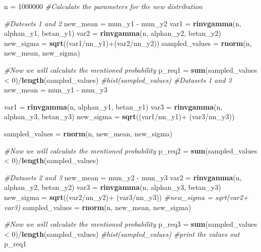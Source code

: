 \documentclass[]{article}
\newenvironment{Shaded}{\begin{snugshade}}{\end{snugshade}}
\newcommand{\KeywordTok}[1]{\textcolor[rgb]{0.13,0.29,0.53}{\textbf{{#1}}}}
\newcommand{\DecValTok}[1]{\textcolor[rgb]{0.00,0.00,0.81}{{#1}}}
\newcommand{\StringTok}[1]{\textcolor[rgb]{0.31,0.60,0.02}{{#1}}}
\newcommand{\CommentTok}[1]{\textcolor[rgb]{0.56,0.35,0.01}{\textit{{#1}}}}
\newcommand{\NormalTok}[1]{{#1}}
\begin{document}
\begin{Shaded}
\begin{Highlighting}[]
\NormalTok{n =}\StringTok{ }\DecValTok{1000000}
\CommentTok{#Calculate the parameters for the new distribution}

\CommentTok{#Datesets 1 and 2}
\NormalTok{new_mean =}\StringTok{ }\NormalTok{mun_y1 -}\StringTok{ }\NormalTok{mun_y2}
\NormalTok{var1 =}\StringTok{ }\KeywordTok{rinvgamma}\NormalTok{(n, alphan_y1, betan_y1)}
\NormalTok{var2 =}\StringTok{ }\KeywordTok{rinvgamma}\NormalTok{(n, alphan_y2, betan_y2)}
\NormalTok{new_sigma =}\StringTok{ }\KeywordTok{sqrt}\NormalTok{((var1/nn_y1)+(var2/nn_y2))}
\NormalTok{sampled_values =}\StringTok{ }\KeywordTok{rnorm}\NormalTok{(n, new_mean, new_sigma)}

\CommentTok{#Now we will calculate the mentioned probability}
\NormalTok{p_req1 =}\StringTok{ }\KeywordTok{sum}\NormalTok{(sampled_values <}\StringTok{ }\DecValTok{0}\NormalTok{)/}\KeywordTok{length}\NormalTok{(sampled_values)}
\CommentTok{#hist(sampled_values)}
\CommentTok{#Datasets 1 and 3}
\NormalTok{new_mean =}\StringTok{ }\NormalTok{mun_y1 -}\StringTok{ }\NormalTok{mun_y3}

\NormalTok{var1 =}\StringTok{ }\KeywordTok{rinvgamma}\NormalTok{(n, alphan_y1, betan_y1)}
\NormalTok{var3 =}\StringTok{ }\KeywordTok{rinvgamma}\NormalTok{(n, alphan_y3, betan_y3)}
\NormalTok{new_sigma =}\StringTok{ }\KeywordTok{sqrt}\NormalTok{((var1/nn_y1)+}\StringTok{ }\NormalTok{(var3/nn_y3))}

\NormalTok{sampled_values =}\StringTok{ }\KeywordTok{rnorm}\NormalTok{(n, new_mean, new_sigma)}

\CommentTok{#Now we will calculate the mentioned probability}
\NormalTok{p_req2 =}\StringTok{ }\KeywordTok{sum}\NormalTok{(sampled_values <}\StringTok{ }\DecValTok{0}\NormalTok{)/}\KeywordTok{length}\NormalTok{(sampled_values)}

\CommentTok{#Datasets 2 and 3}
\NormalTok{new_mean =}\StringTok{ }\NormalTok{mun_y2 -}\StringTok{ }\NormalTok{mun_y3}
\NormalTok{var2 =}\StringTok{ }\KeywordTok{rinvgamma}\NormalTok{(n, alphan_y2, betan_y2)}
\NormalTok{var3 =}\StringTok{ }\KeywordTok{rinvgamma}\NormalTok{(n, alphan_y3, betan_y3)}
\NormalTok{new_sigma =}\StringTok{ }\KeywordTok{sqrt}\NormalTok{((var2/nn_y2)+}\StringTok{ }\NormalTok{(var3/nn_y3))}
\CommentTok{#new_sigma = sqrt(var2+ var3)}
\NormalTok{sampled_values =}\StringTok{ }\KeywordTok{rnorm}\NormalTok{(n, new_mean, new_sigma)}

\CommentTok{#Now we will calculate the mentioned probability}
\NormalTok{p_req3 =}\StringTok{ }\KeywordTok{sum}\NormalTok{(sampled_values <}\StringTok{ }\DecValTok{0}\NormalTok{)/}\KeywordTok{length}\NormalTok{(sampled_values)}
\CommentTok{#hist(sampled_values)}
\CommentTok{#print the values out}
\NormalTok{p_req1}
\end{Highlighting}
\end{Shaded}
\end{document}

